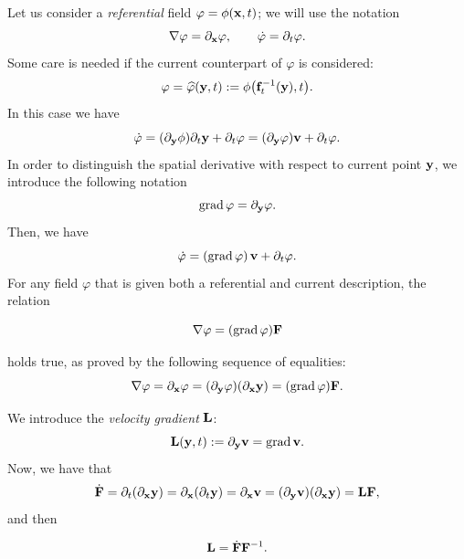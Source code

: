 Let us consider a \textit{referential} field $\varphi=\phi(\mathbf{x},t)$; we will use the notation
\begin{equation}
	\nabla\varphi=\partial_{\mathbf{x}}\varphi, \qquad \dot{\varphi}=\partial_t\varphi.
\end{equation}
Some care is needed if the current counterpart of $\varphi$ is considered:
\begin{equation}
	\varphi=\widehat{\varphi}(\mathbf{y},t):=\phi\big( \mathbf{f}_t^{-1}(\mathbf{y}),t  \big).
\end{equation}
In this case we have
\begin{equation}
	\dot{\varphi}=(\partial_{\mathbf{y}}\phi)\partial_t \mathbf{y}+\partial_t\varphi=(\partial_{\mathbf{y}}\varphi)\mathbf{v}+\partial_t\varphi.
\end{equation}
In order to distinguish the spatial derivative with respect to current point $\mathbf{y}$, we introduce the following notation
\begin{equation}
	\operatorname{grad}\varphi=\partial_{\mathbf{y}}\varphi.
\end{equation}
Then, we have
\begin{equation}
	\dot\varphi=(\operatorname{grad}\varphi)\,\mathbf{v}+\partial_t\varphi.
\end{equation}
For any field $\varphi$ that is given both a referential and current description, the relation
\begin{definition}
\begin{equation}
	\nabla\varphi=(\operatorname{grad} \varphi)\mathbf{F}
\end{equation}
\end{definition}
holds true, as proved by the following sequence of equalities:
\begin{equation}
	\nabla\varphi=\partial_{\mathbf{x}}\varphi=(\partial_{\mathbf{y}}\varphi)(\partial_{\mathbf{x}} \mathbf{y})=(\operatorname{grad} \varphi)\mathbf{F}.
\end{equation}


We introduce the \textit{velocity gradient} $\mathbf{L}$:
\begin{equation}
	\mathbf{L}(\mathbf{y},t):=\partial_{\mathbf{y}}\mathbf{v}=\operatorname{grad}\mathbf{v}.
\end{equation}
Now, we have that
\begin{equation}
	\dot{\mathbf{F}}=\partial_t(\partial_{\mathbf{x}} \mathbf{y})=\partial_{\mathbf{x}}(\partial_t \mathbf{y})=\partial_{\mathbf{x}}\mathbf{v}=(\partial_{\mathbf{y}}\mathbf{v})(\partial_{\mathbf{x}} \mathbf{y})=\mathbf{L}\mathbf{F},
\end{equation}
and then
\begin{definition}
\begin{equation}
	\mathbf{L}=\dot{\mathbf{F}}\mathbf{F}^{-1}.
\end{equation}
\end{definition}

